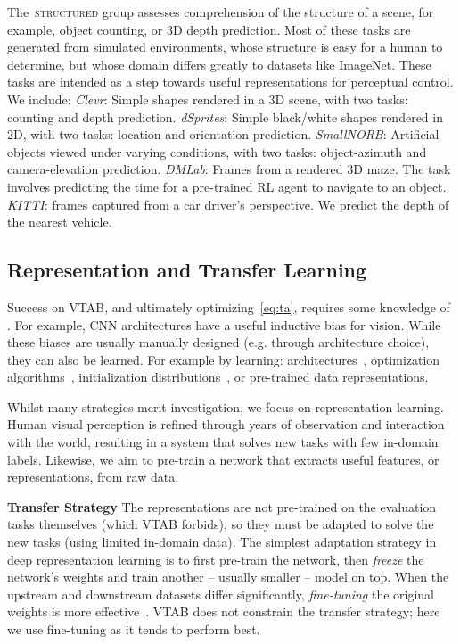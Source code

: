 \documentclass{article}
\newcommand{\myparagraph}[1]{\noindent\textbf{#1}\quad}
\DeclareRobustCommand{\taskStructured}{\raisebox{0.5pt}{\tikz{\fill[structured] (0,0) circle (.5ex);}}\,\textsc{structured}}
\newcommand{\imagenet}{ImageNet}
\begin{document}
The \taskStructured{} group assesses comprehension of the structure of a scene, for example, object counting, or 3D depth prediction.
Most of these tasks are generated from simulated environments, whose structure is easy for a human to determine, but whose domain differs greatly to datasets like \imagenet{}.
These tasks are intended as a step towards useful representations for perceptual control.
We include:
\emph{Clevr}: Simple shapes rendered in a 3D scene, with two tasks: counting and depth prediction.
\emph{dSprites}: Simple black/white shapes rendered in 2D, with two tasks: location and orientation prediction.
\emph{SmallNORB}: Artificial objects viewed under varying conditions, with two tasks: object-azimuth and camera-elevation prediction.
\emph{DMLab}: Frames from a rendered 3D maze. The task involves predicting the time for a pre-trained RL agent to navigate to an object.
\emph{KITTI}: frames captured from a car driver's perspective.
We predict the depth of the nearest vehicle.

\subsection{Representation and Transfer Learning}

Success on VTAB, and ultimately optimizing~\cref{eq:ta}, requires some knowledge of .
For example, CNN architectures have a useful inductive bias for vision.
While these biases are usually manually designed (e.g. through architecture choice), they can also be learned.
For example by learning: architectures~\citet{zoph2017}, optimization algorithms~\citet{bello2017neural}, initialization distributions~\citet{raghu2019},
or pre-trained data representations.

Whilst many strategies merit investigation, we focus on representation learning.
Human visual perception is refined through years of observation and interaction with the world, resulting in a system that solves new tasks with few in-domain labels.
Likewise, we aim to pre-train a network that extracts useful features, or representations, from raw data.

\myparagraph{Transfer Strategy}
The representations are not pre-trained on the evaluation tasks themselves (which VTAB forbids), so they must be adapted to solve the new tasks (using limited in-domain data).
The simplest adaptation strategy in deep representation learning is to first pre-train the network, then \emph{freeze} the network's weights and train another -- usually smaller -- model on top.
When the upstream and downstream datasets differ significantly,
\emph{fine-tuning} the original weights is more effective~\citep{yosinski2014,kornblith2018better}.
VTAB does not constrain the transfer strategy; here we use fine-tuning as it tends to perform best.
\end{document}
